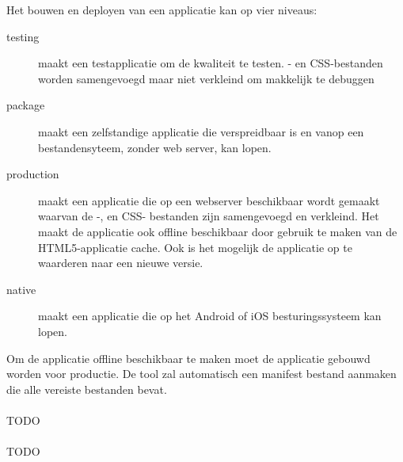 Het bouwen en deployen van een applicatie kan op vier niveaus:
\begin{description}
  \item [testing] maakt een testapplicatie om de kwaliteit te testen.  \js- en CSS-bestanden worden samengevoegd maar niet verkleind om makkelijk te debuggen
  \item [package] maakt een zelfstandige applicatie die verspreidbaar is en vanop een bestandensyteem,  zonder web server,  kan lopen.
  \item [production] maakt een applicatie die op een webserver beschikbaar wordt gemaakt waarvan de \js-, en CSS- bestanden zijn samengevoegd en verkleind.  Het maakt de applicatie ook offline beschikbaar door gebruik te maken van de HTML5-applicatie cache.  Ook is het mogelijk de applicatie op te waarderen naar een nieuwe versie.
  \item [native] maakt een  applicatie die op het Android of iOS besturingssysteem kan lopen.
\end{description}
Om de applicatie offline beschikbaar te maken moet de applicatie gebouwd worden voor productie.
De tool zal automatisch een manifest bestand aanmaken die alle vereiste bestanden bevat.

\paragraph{\kendo}
TODO

\paragraph{\lungo}
TODO

\begin{table}[H]
\centering
{}
\caption{Scores voor U10: Offline}
\label{tabel:evaluatie-gebruik-u10}
\end{table}

